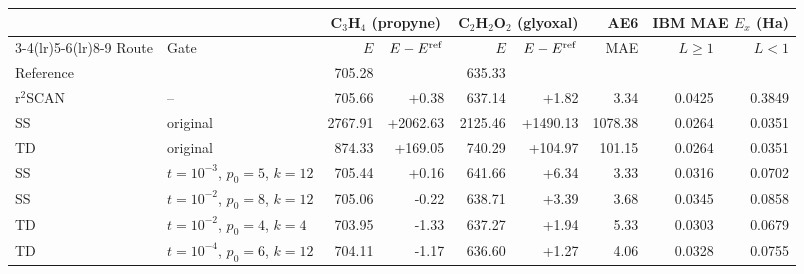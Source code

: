 \begin{tabular}{@{}ll rr rr r rr@{}}
\toprule
 & & \multicolumn{2}{c}{C$_3$H$_4$ (propyne)} & \multicolumn{2}{c}{C$_2$H$_2$O$_2$ (glyoxal)} & AE6 & \multicolumn{2}{c}{IBM MAE $E_x$ (Ha)} \\
\cmidrule(lr){3-4}\cmidrule(lr){5-6}\cmidrule(lr){8-9}
Route & Gate & $E$ & $E-E^{\rm ref}$ & $E$ & $E-E^{\rm ref}$ & MAE & $L\geq1$ & $L<1$ \\
\midrule
Reference & & 705.28 & & 635.33 & & & & \\
\midrule
r$^2$SCAN & -- & \textcolor{pyscfred}{705.66} & \textcolor{pyscfred}{+0.38} & \textcolor{pyscfred}{637.14} & \textcolor{pyscfred}{+1.82} & \textcolor{pyscfred}{3.34} & \textcolor{pyscfred}{0.0425} & \textcolor{pyscfred}{0.3849} \\
SS & original & \textcolor{pyscfred}{2767.91} & \textcolor{pyscfred}{+2062.63} & \textcolor{pyscfred}{2125.46} & \textcolor{pyscfred}{+1490.13} & \textcolor{pyscfred}{1078.38} & \textcolor{pyscfred}{0.0264} & \textcolor{pyscfred}{0.0351} \\
TD & original & \textcolor{pyscfred}{874.33} & \textcolor{pyscfred}{+169.05} & \textcolor{pyscfred}{740.29} & \textcolor{pyscfred}{+104.97} & \textcolor{pyscfred}{101.15} & \textcolor{pyscfred}{0.0264} & \textcolor{pyscfred}{0.0351} \\
SS & $t{=}10^{-3}$, $p_0{=}5$, $k{=}12$ & \textcolor{pyscfred}{705.44} & \textcolor{pyscfred}{+0.16} & \textcolor{pyscfred}{641.66} & \textcolor{pyscfred}{+6.34} & \textcolor{pyscfred}{3.33} & \textcolor{pyscfred}{0.0316} & \textcolor{pyscfred}{0.0702} \\
SS & $t{=}10^{-2}$, $p_0{=}8$, $k{=}12$ & \textcolor{pyscfred}{705.06} & \textcolor{pyscfred}{-0.22} & \textcolor{pyscfred}{638.71} & \textcolor{pyscfred}{+3.39} & \textcolor{pyscfred}{3.68} & \textcolor{pyscfred}{0.0345} & \textcolor{pyscfred}{0.0858} \\
TD & $t{=}10^{-2}$, $p_0{=}4$, $k{=}4$ & \textcolor{pyscfred}{703.95} & \textcolor{pyscfred}{-1.33} & \textcolor{pyscfred}{637.27} & \textcolor{pyscfred}{+1.94} & \textcolor{pyscfred}{5.33} & \textcolor{pyscfred}{0.0303} & \textcolor{pyscfred}{0.0679} \\
TD & $t{=}10^{-4}$, $p_0{=}6$, $k{=}12$ & \textcolor{pyscfred}{704.11} & \textcolor{pyscfred}{-1.17} & \textcolor{pyscfred}{636.60} & \textcolor{pyscfred}{+1.27} & \textcolor{pyscfred}{4.06} & \textcolor{pyscfred}{0.0328} & \textcolor{pyscfred}{0.0755} \\
\bottomrule
\end{tabular}
